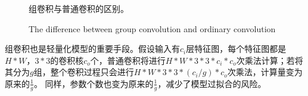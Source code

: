 \documentclass[10pt]{ctexart}
\begin{document}
\begin{multicols}{2}
\begin{figure}[H]
    \centering
        \caption[]{组卷积与普通卷积的区别。}
        \addtocounter{figure}{-1}
        \vspace{-5pt}
        \renewcommand{\figurename}{Fig}
        \caption{The difference between group convolution and ordinary convolution}
        \renewcommand{\figurename}{图}
        \label{pic:GC}
\end{figure}

组卷积也是轻量化模型的重要手段。假设输入有$c_i$层特征图，每个特征图都是$H*W$，$3*3$的卷积核$c_o$个，普通卷积将进行$H*W*3*3*c_i*c_o$次乘法计算；若将其分为$g$组，整个卷积过程只会进行$H*W*3*3*(c_i/g)*c_o$次乘法，计算量变为原来的$\frac{1}{g}$。
同样，参数个数也变为原来的$\frac{1}{g}$，减少了模型过拟合的风险。


\end{multicols}
\end{document}
